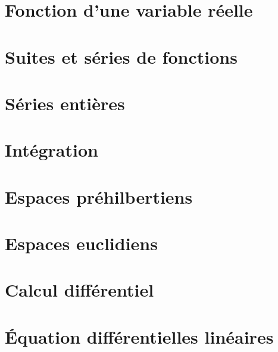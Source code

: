 \documentclass[12pt]{article}
\theoremstyle{remark}
\numberwithin{equation}{section}
\begin{document}
\cleardoublepage
\section{Fonction d'une variable réelle}
\cleardoublepage
\section{Suites et séries de fonctions}
\cleardoublepage
\section{Séries entières}
\cleardoublepage
\section{Intégration}
\cleardoublepage
\section{Espaces préhilbertiens}
\cleardoublepage
\section{Espaces euclidiens}
\cleardoublepage
\section{Calcul différentiel}
\cleardoublepage
\section{\'Equation différentielles linéaires}
\end{document}
